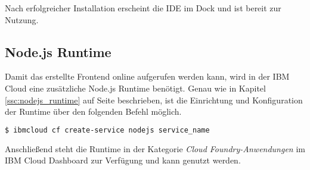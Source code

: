 Nach erfolgreicher Installation erscheint die IDE im Dock und ist bereit zur Nutzung.

\subsection{Node.js Runtime}
Damit das erstellte Frontend online aufgerufen werden kann, wird in der IBM Cloud eine zusätzliche Node.js Runtime
benötigt. Genau wie in Kapitel \ref{ssc:nodejs_runtime} auf Seite \pageref{ssc:nodejs_runtime} beschrieben, ist die
Einrichtung und Konfiguration der Runtime über den folgenden Befehl möglich.

\begin{lstlisting}[language=bash, caption=Instanziierung der Node.js Runtime, label=ls:vorbereitung_nodejsdashboard]
    $ ibmcloud cf create-service nodejs service_name
\end{lstlisting}

Anschließend steht die Runtime in der Kategorie \textit{Cloud Foundry-Anwendungen} im IBM Cloud Dashboard zur Verfügung
und kann genutzt werden.